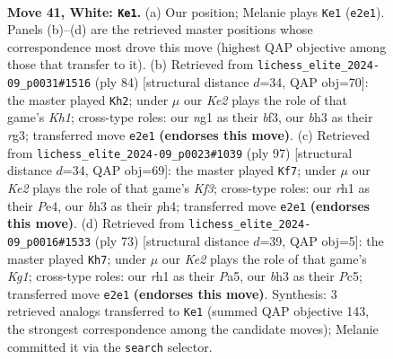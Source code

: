 \documentclass[11pt]{article}
\begin{document}
\clearpage

\begin{figure}[p]\centering
\begin{subfigure}{0.46\textwidth}\centering
\resizebox{\linewidth}{!}{%
\newchessgame
\chessboard[
  setfen={7k/R4p1p/3P1rp1/8/1p2P3/6Pb/4K2P/6nr w - - 1 41},
  showmover=false,
  pgfstyle=straightmove, color=movearrow, markmove={e2-e1}
]}
\caption{}
\end{subfigure}\hfill
\begin{subfigure}{0.46\textwidth}\centering
\resizebox{\linewidth}{!}{%
\newchessgame
\chessboard[
  setfen={6k1/2p3p1/5p2/P2n4/1N1P4/5brP/8/2R4K w - - 0 43},
  showmover=false,
  pgfstyle=straightmove, color=movearrow, markmove={h1-h2}
]}
\caption{}
\end{subfigure}
\\[4pt]
\begin{subfigure}{0.46\textwidth}\centering
\resizebox{\linewidth}{!}{%
\newchessgame
\chessboard[
  setfen={8/1p6/p4k2/3N2Rp/1P2p2P/P5PK/3r4/8 b - - 1 49},
  showmover=false,
  pgfstyle=straightmove, color=movearrow, markmove={f6-f7}
]}
\caption{}
\end{subfigure}\hfill
\begin{subfigure}{0.46\textwidth}\centering
\resizebox{\linewidth}{!}{%
\newchessgame
\chessboard[
  setfen={6k1/8/7p/p1p1Bpn1/2P4R/4P1P1/2r4P/5K2 b - - 1 37},
  showmover=false,
  pgfstyle=straightmove, color=movearrow, markmove={g8-h7}
]}
\caption{}
\end{subfigure}
\caption{\textbf{Move 41, White: \texttt{Ke1}.} (a) Our position; Melanie plays \texttt{Ke1} (\texttt{e2e1}). Panels (b)--(d) are the retrieved master positions whose correspondence most drove this move (highest QAP objective among those that transfer to it). (b) Retrieved from \texttt{lichess\_elite\_2024-09\_p0031\#1516} (ply 84) [structural distance $d$=34, QAP obj=70]: the master played \texttt{Kh2}; under $\mu$ our \emph{Ke2} plays the role of that game's \emph{Kh1}; cross-type roles: our \emph{n}g1 as their \emph{b}f3, our \emph{b}h3 as their \emph{r}g3; transferred move \texttt{e2e1} \textbf{(endorses this move)}. (c) Retrieved from \texttt{lichess\_elite\_2024-09\_p0023\#1039} (ply 97) [structural distance $d$=34, QAP obj=69]: the master played \texttt{Kf7}; under $\mu$ our \emph{Ke2} plays the role of that game's \emph{Kf3}; cross-type roles: our \emph{r}h1 as their \emph{P}e4, our \emph{b}h3 as their \emph{p}h4; transferred move \texttt{e2e1} \textbf{(endorses this move)}. (d) Retrieved from \texttt{lichess\_elite\_2024-09\_p0016\#1533} (ply 73) [structural distance $d$=39, QAP obj=5]: the master played \texttt{Kh7}; under $\mu$ our \emph{Ke2} plays the role of that game's \emph{Kg1}; cross-type roles: our \emph{r}h1 as their \emph{P}a5, our \emph{b}h3 as their \emph{P}c5; transferred move \texttt{e2e1} \textbf{(endorses this move)}. Synthesis: 3 retrieved analogs transferred to \texttt{Ke1} (summed QAP objective 143, the strongest correspondence among the candidate moves); Melanie committed it via the \texttt{search} selector.}
\label{fig:thought-m80}
\end{figure}
\end{document}
